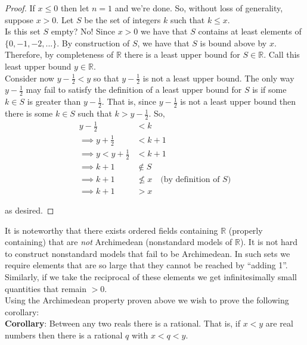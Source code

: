 \documentclass[12pt]{article}
\newlength\tindent
\renewcommand{\indent}{\hspace*{\tindent}}
\newcommand{\R}{\mathbb R}
\begin{document}
\begin{proof} If $x \leq 0$ then let $n = 1$ and we're done. So, without loss of generality, suppose $x > 0$. Let $S$ be the set of integers $k$ such that $k \leq x$. \\

\indent Is this set $S$ empty? No! Since $x > 0$ we have that $S$ contains at least elements of $\{0, -1, -2, ...\}$. By construction of $S$, we have that $S$ is bound above by $x$. Therefore, by completeness of $\R$ there is a least upper bound for $S \in \R$. Call this least upper bound $y \in \R$. \\

\indent Consider now $y - \frac{1}{2} < y$ so that $y - \frac{1}{2}$ is not a least upper bound. The only way $y - \frac{1}{2}$ may fail to satisfy the definition of a least upper bound for $S$ is if some $k \in S$ is greater than $y - \frac{1}{2}$. That is, since $y - \frac{1}{2}$ is not a least upper bound then there is some $k \in S$ such that $k > y - \frac{1}{2}$. So,
\begin{align*}
	y - \frac{1}{2} &< k \\
	\implies y + \frac{1}{2} &< k + 1 \\
	\implies y < y + \frac{1}{2} &< k + 1 \\
	\implies k + 1 &\notin S \\
	\implies k + 1 &\nleq x \quad \text{(by definition of $S$)} \\
	\implies k + 1 &> x
\end{align*}

as desired.
\end{proof}

\indent It is noteworthy that there exists ordered fields containing $\R$ (properly containing) that are {\em not} Archimedean (nonstandard models of $\R$). It is not hard to construct nonstandard models that fail to be Archimedean. In such sets we require elements that are so large that they cannot be reached by ``adding 1''. Similarly, if we take the reciprocal of these elements we get infinitesimally small quantities that remain $> 0$. \\

Using the Archimedean property proven above we wish to prove the following corollary: \\

%
%
{\bf Corollary}: Between any two reals there is a rational. That is, if $x < y$ are real numbers then there is a rational $q$ with $x < q < y$.
\end{document}

